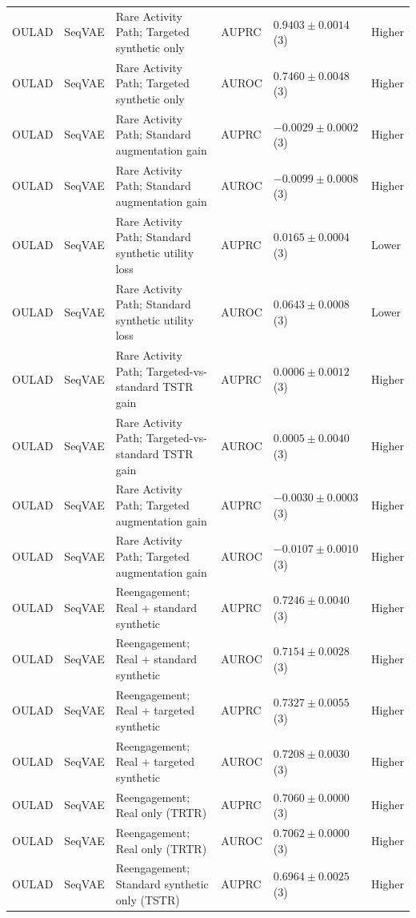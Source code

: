 \begin{longtable}{@{}p{2.25cm}p{2.05cm}p{4.7cm}p{5.0cm}p{2.6cm}p{1.25cm}@{}}
OULAD & SeqVAE & Rare Activity Path; Targeted synthetic only & AUPRC & $0.9403 \mathbin{\pm} 0.0014$ (3) & Higher \\
OULAD & SeqVAE & Rare Activity Path; Targeted synthetic only & AUROC & $0.7460 \mathbin{\pm} 0.0048$ (3) & Higher \\
OULAD & SeqVAE & Rare Activity Path; Standard augmentation gain & AUPRC & $-0.0029 \mathbin{\pm} 0.0002$ (3) & Higher \\
OULAD & SeqVAE & Rare Activity Path; Standard augmentation gain & AUROC & $-0.0099 \mathbin{\pm} 0.0008$ (3) & Higher \\
OULAD & SeqVAE & Rare Activity Path; Standard synthetic utility loss & AUPRC & $0.0165 \mathbin{\pm} 0.0004$ (3) & Lower \\
OULAD & SeqVAE & Rare Activity Path; Standard synthetic utility loss & AUROC & $0.0643 \mathbin{\pm} 0.0008$ (3) & Lower \\
OULAD & SeqVAE & Rare Activity Path; Targeted-vs-standard TSTR gain & AUPRC & $0.0006 \mathbin{\pm} 0.0012$ (3) & Higher \\
OULAD & SeqVAE & Rare Activity Path; Targeted-vs-standard TSTR gain & AUROC & $0.0005 \mathbin{\pm} 0.0040$ (3) & Higher \\
OULAD & SeqVAE & Rare Activity Path; Targeted augmentation gain & AUPRC & $-0.0030 \mathbin{\pm} 0.0003$ (3) & Higher \\
OULAD & SeqVAE & Rare Activity Path; Targeted augmentation gain & AUROC & $-0.0107 \mathbin{\pm} 0.0010$ (3) & Higher \\
OULAD & SeqVAE & Reengagement; Real + standard synthetic & AUPRC & $0.7246 \mathbin{\pm} 0.0040$ (3) & Higher \\
OULAD & SeqVAE & Reengagement; Real + standard synthetic & AUROC & $0.7154 \mathbin{\pm} 0.0028$ (3) & Higher \\
OULAD & SeqVAE & Reengagement; Real + targeted synthetic & AUPRC & $0.7327 \mathbin{\pm} 0.0055$ (3) & Higher \\
OULAD & SeqVAE & Reengagement; Real + targeted synthetic & AUROC & $0.7208 \mathbin{\pm} 0.0030$ (3) & Higher \\
OULAD & SeqVAE & Reengagement; Real only (TRTR) & AUPRC & $0.7060 \mathbin{\pm} 0.0000$ (3) & Higher \\
OULAD & SeqVAE & Reengagement; Real only (TRTR) & AUROC & $0.7062 \mathbin{\pm} 0.0000$ (3) & Higher \\
OULAD & SeqVAE & Reengagement; Standard synthetic only (TSTR) & AUPRC & $0.6964 \mathbin{\pm} 0.0025$ (3) & Higher \\

\end{longtable}
